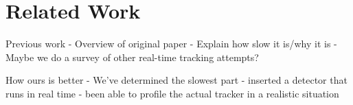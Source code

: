 \section{Related Work}
\label{sec:related}

Previous work
- Overview of original paper
- Explain how slow it is/why it is
- Maybe we do a survey of other real-time tracking attempts?

How ours is better
- We've determined the slowest part
- inserted a detector that runs in real time
- been able to profile the actual tracker in a realistic situation